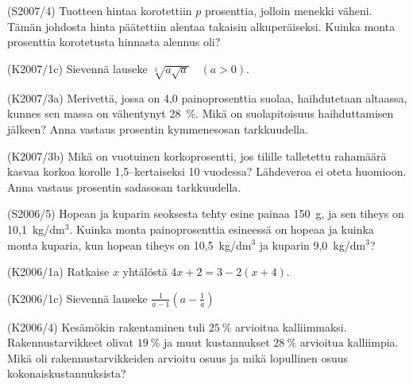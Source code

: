 \begin{tehtava}(S2007/4)   Tuotteen hintaa korotettiin $p$ prosenttia, jolloin menekki väheni.
                        Tämän johdosta hinta päätettiin alentaa takaisin alkuperäiseksi.
                        Kuinka monta prosenttia korotetusta hinnasta alennus oli?
\end{tehtava}

\begin{tehtava}(K2007/1c)  Sievennä lauseke $ \sqrt[3]{a \sqrt{a}} \quad (a > 0) $.
\end{tehtava}

\begin{tehtava}(K2007/3a)  Merivettä, jossa on 4,0 painoprosenttia suolaa, haihdutetaan
                        altaassa, kunnes sen massa on vähentynyt 28~\%. Mikä on
                        suolapitoisuus haihduttamisen jälkeen? Anna vastaus prosentin
                        kymmenesosan tarkkuudella. 
\end{tehtava}

\begin{tehtava}(K2007/3b)  Mikä on vuotuinen korkoprosentti, jos tilille talletettu rahamäärä
                        kasvaa korkoa korolle 1,5--kertaiseksi 10 vuodessa? Lähdeveroa
                        ei oteta huomioon. Anna vastaus prosentin sadasosan 
                        tarkkuudella.
\end{tehtava}

\begin{tehtava}(S2006/5)   Hopean ja kuparin seoksesta tehty esine painaa 150~g, ja sen
                       tiheys on 10,1~kg/dm\(^3\). Kuinka monta painoprosenttia 
                        esineessä on hopeaa ja kuinka monta kuparia, kun hopean tiheys on 
                        10,5~kg/dm\(^3\) ja kuparin 9,0~kg/dm\(^3\)?
\end{tehtava}

\begin{tehtava}(K2006/1a)  Ratkaise $x$ yhtälöstä $4x + 2 =  3 - 2(x + 4)$.
\end{tehtava}

\begin{tehtava}(K2006/1c)  Sievennä lauseke 
                        $ \frac{1}{a - 1} \left( a - \frac{1}{a} \right) $
\end{tehtava}

\begin{tehtava}(K2006/4)   Kesämökin rakentaminen tuli $25~\%$ arvioitua kalliimmaksi.
 Rakennustarvikkeet olivat $19~\%$ ja muut kustannukset $28~\% $
                        arvioitua kalliimpia. Mikä oli rakennustarvikkeiden arvioitu osuus ja 
                        mikä lopullinen osuus kokonaiskustannuksista?
\end{tehtava}

